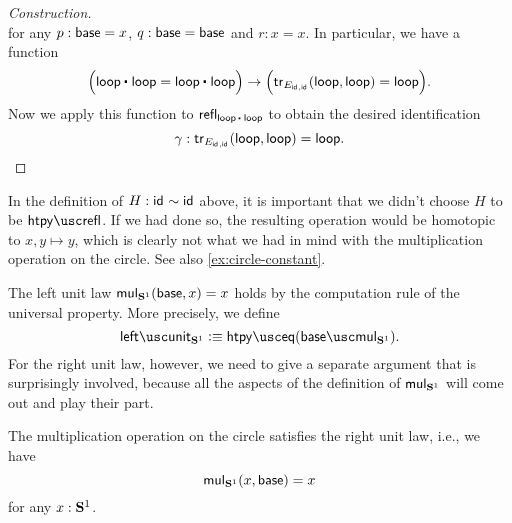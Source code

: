 \begin{proof}[Construction]
\begin{equation*}
  \end{equation*}
  for any $p:\mathsf{base}=x$, $q:\mathsf{base}=\mathsf{base}$ and $r:x=x$. In particular, we have a function
  \begin{equation*}
    \Big(\ct{\lloop}{\lloop}=\ct{\lloop}{\lloop}\Big)\to\Big(\tr_{E_{\idfunc,\idfunc}}(\lloop,\lloop)=\lloop\Big).
  \end{equation*}
  Now we apply this function to $\refl{\ct{\lloop}{\lloop}}$ to obtain the desired identification
  \begin{equation*}
    \gamma:\mathsf{tr}_{E_{\mathsf{id}_{},\mathsf{id}_{}}}(\mathsf{loop},\mathsf{loop})=\mathsf{loop}.\qedhere
  \end{equation*}
\end{proof}

\begin{rmk}
  In the definition of $H:\mathsf{id}_{}\sim\mathsf{id}_{}$ above, it is important that we didn't choose $H$ to be $\htpyrefl$. If we had done so, the resulting operation would be homotopic to $x,y\mapsto y$, which is clearly not what we had in mind with the multiplication operation on the circle. See also \cref{ex:circle-constant}.
\end{rmk}


The left unit law $\mathsf{mul}_{\mathbf{S}^{1}}(\mathsf{base},x)=x$ holds by the computation rule of the universal property. More precisely, we define
\begin{equation*}
  \leftunit_{\sphere{1}}\defeq \htpyeq(\basemulcircle).
\end{equation*}
For the right unit law, however, we need to give a separate argument that is surprisingly involved, because all the aspects of the definition of $\mathsf{mul}_{\mathbf{S}^{1}}$ will come out and play their part.

\begin{thm}
  The multiplication operation on the circle satisfies the right unit law, i.e., we have
  \begin{equation*}
    \mathsf{mul}_{\mathbf{S}^{1}}(x,\mathsf{base})=x
  \end{equation*}
  for any $x:\mathbf{S}^{1}$.
\end{thm}

